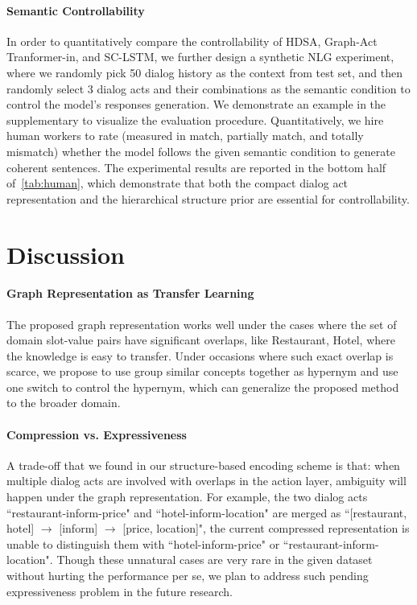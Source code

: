 \documentclass[11pt,a4paper]{article}
\begin{document}
\paragraph{Semantic Controllability}\label{sec:controllability} In order to quantitatively compare the controllability of HDSA, Graph-Act Tranformer-in, and SC-LSTM, we further design a synthetic NLG experiment, where we randomly pick 50 dialog history as the context from test set, and then randomly select 3 dialog acts and their combinations as the semantic condition to control the model's responses generation. We demonstrate an example in the supplementary to visualize the evaluation procedure. Quantitatively, we hire human workers to rate (measured in match, partially match, and totally mismatch) whether the model follows the given semantic condition to generate coherent sentences. The experimental results are reported in the bottom half of~\autoref{tab:human}, which demonstrate that both the compact dialog act representation and the hierarchical structure prior are essential for controllability.

\section{Discussion}
\paragraph{Graph Representation as Transfer Learning}
The proposed graph representation works well under the cases where the set of domain slot-value pairs have significant overlaps, like Restaurant, Hotel, where the knowledge is easy to transfer. Under occasions where such exact overlap is scarce, we propose to use group similar concepts together as hypernym and use one switch to control the hypernym, which can generalize the proposed method to the broader domain. 
\paragraph{Compression vs. Expressiveness}
A trade-off that we found in our structure-based encoding scheme is that: when multiple dialog acts are involved with overlaps in the action layer, ambiguity will happen under the graph representation. For example, the two dialog acts ``restaurant-inform-price" and  ``hotel-inform-location" are merged as ``[restaurant, hotel] $\rightarrow$ [inform] $\rightarrow$ [price, location]", the current compressed representation is unable to distinguish them with ``hotel-inform-price" or ``restaurant-inform-location". Though these unnatural cases are very rare in the given dataset without hurting the performance per se, we plan to address such pending expressiveness problem in the future research.
\end{document}
